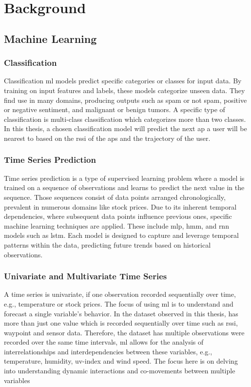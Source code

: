 \chapter{Background}\label{sec:background}

\section{Machine Learning }

\subsection{Classification}

Classification \ac{ml} models predict specific categories or classes for input data.
By training on input features and labels, these models categorize unseen data.
They find use in many domains, producing outputs such as spam or not spam, positive or negative sentiment, and malignant or benign tumors.
A specific type of classification is multi-class classification which categorizes more than two classes. \cite[pp.179-182]{BishopPatternRecognition}
In this thesis, a chosen classification model will predict the next \ac{ap} a user will be nearest to based on the \ac{rssi} of the \acp{ap} and the trajectory of the user.


\subsection{Time Series Prediction}

Time series prediction is a type of supervised learning problem where a model is trained on a sequence of observations and learns to predict the next value in the sequence.
Those sequences consist of data points arranged chronologically, prevalent in numerous domains like stock prices.
Due to its inherent temporal dependencies, where subsequent data points influence previous ones, specific machine learning techniques are applied.
These include \ac{mlp}, \ac{hmm}, and \ac{rnn} models such as \ac{lstm}.
Each model is designed to capture and leverage temporal patterns within the data, predicting future trends based on historical observations. \cite{neptune-ai}


\subsection{Univariate and Multivariate Time Series}

A time series is univariate, if one observation recorded sequentially over time, e.g., temperature or stock prices.
The focus of using \ac{ml} is to understand and forecast a single variable's behavior.
In the dataset observed in this thesis, has more than just one value which is recorded sequentially over time such as \ac{rssi}, waypoint and sensor data.  
Therefore, the dataset has multiple observations were recorded over the same time intervals, \ac{ml} allows for the analysis of interrelationships and interdependencies between these variables, e.g., temperature, humidity, uv-index and wind speed.
The focus here is on delving into understanding dynamic interactions and co-movements between multiple variables

